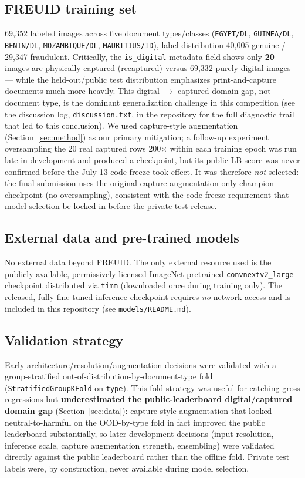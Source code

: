 \documentclass[11pt,a4paper]{article}
\begin{document}
\subsection{FREUID training set}
69{,}352 labeled images across five document types/classes (\texttt{EGYPT/DL},
\texttt{GUINEA/DL}, \texttt{BENIN/DL}, \texttt{MOZAMBIQUE/DL},
\texttt{MAURITIUS/ID}), label distribution 40{,}005 genuine / 29{,}347
fraudulent. Critically, the \texttt{is\_digital} metadata field shows only
\textbf{20} images are physically captured (recaptured) versus 69{,}332
purely digital images — while the held-out/public test distribution
emphasizes print-and-capture documents much more heavily. This digital
$\rightarrow$ captured domain gap, not document type, is the dominant
generalization challenge in this competition (see the discussion log,
\texttt{discussion.txt}, in the repository for the full diagnostic trail that
led to this conclusion). We used capture-style augmentation
(Section~\ref{sec:method}) as our primary mitigation; a follow-up experiment
oversampling the 20 real captured rows 200$\times$ within each training epoch
was run late in development and produced a checkpoint, but its public-LB
score was never confirmed before the July 13 code freeze took effect. It was
therefore \emph{not} selected: the final submission uses the original
capture-augmentation-only champion checkpoint (no oversampling), consistent
with the code-freeze requirement that model selection be locked in before
the private test release.

\subsection{External data and pre-trained models}
No external data beyond FREUID. The only external resource used is the
publicly available, permissively licensed ImageNet-pretrained
\texttt{convnextv2\_large} checkpoint distributed via \texttt{timm}
(downloaded once during training only). The released, fully fine-tuned
inference checkpoint requires \emph{no} network access and is included in
this repository (see \texttt{models/README.md}).

\subsection{Validation strategy}
Early architecture/resolution/augmentation decisions were validated with a
group-stratified out-of-distribution-by-document-type fold
(\texttt{StratifiedGroupKFold} on \texttt{type}). This fold strategy was
useful for catching gross regressions but \textbf{underestimated the
public-leaderboard digital/captured domain gap} (Section~\ref{sec:data}):
capture-style augmentation that looked neutral-to-harmful on the OOD-by-type
fold in fact improved the public leaderboard substantially, so later
development decisions (input resolution, inference scale, capture
augmentation strength, ensembling) were validated directly against the
public leaderboard rather than the offline fold. Private test labels were,
by construction, never available during model selection.
\end{document}
